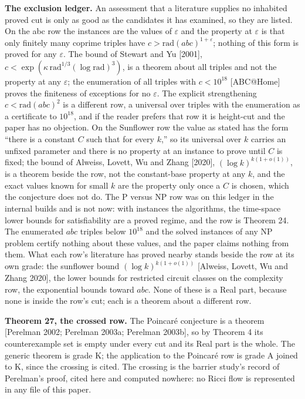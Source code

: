 \documentclass[10pt,twocolumn]{article}
\begin{document}
\textbf{The exclusion ledger.} An assessment that a literature supplies
no inhabited proved cut is only as good as the candidates it has
examined, so they are listed. On the abc row the instances are the
values of \(\varepsilon\) and the property at \(\varepsilon\) is that
only finitely many coprime triples have
\(c > \mathrm{rad}(abc)^{1+\varepsilon}\); nothing of this form is
proved for any \(\varepsilon\). The bound of Stewart and Yu {[}2001{]},
\(c < \exp(\kappa\, \mathrm{rad}^{1/3} (\log \mathrm{rad})^3)\), is a
theorem about all triples and not the property at any \(\varepsilon\);
the enumeration of all triples with \(c < 10^{18}\) {[}ABC@Home{]}
proves the finiteness of exceptions for no \(\varepsilon\). The explicit
strengthening \(c < \mathrm{rad}(abc)^2\) is a different row, a
universal over triples with the enumeration as a certificate to
\(10^{18}\), and if the reader prefers that row it is height-cut and the
paper has no objection. On the Sunflower row the value as stated has the
form ``there is a constant \(C\) such that for every \(k\),'' so its
universal over \(k\) carries an unfixed parameter and there is no
property at an instance to prove until \(C\) is fixed; the bound of
Alweiss, Lovett, Wu and Zhang {[}2020{]}, \((\log k)^{k(1+o(1))}\), is a
theorem beside the row, not the constant-base property at any \(k\), and
the exact values known for small \(k\) are the property only once a
\(C\) is chosen, which the conjecture does not do. The P versus NP row
was on this ledger in the internal builds and is not now: with instances
the algorithms, the time-space lower bounds for satisfiability are a
proved regime, and the row is Theorem 24. The enumerated \(abc\) triples
below \(10^{18}\) and the solved instances of any \(\mathrm{NP}\)
problem certify nothing about these values, and the paper claims nothing
from them. What each row's literature has proved nearby stands beside
the row at its own grade: the sunflower bound \((\log k)^{k(1 + o(1))}\)
{[}Alweiss, Lovett, Wu and Zhang 2020{]}, the lower bounds for
restricted circuit classes on the complexity row, the exponential bounds
toward \(abc\). None of these is a Real part, because none is inside the
row's cut; each is a theorem about a different row.

\textbf{Theorem 27, the crossed row.} The Poincaré conjecture is a
theorem {[}Perelman 2002; Perelman 2003a; Perelman 2003b{]}, so by
Theorem 4 its counterexample set is empty under every cut and its Real
part is the whole. The generic theorem is grade K; the application to
the Poincaré row is grade A joined to K, since the crossing is cited.
The crossing is the barrier study's record of Perelman's proof, cited
here and computed nowhere: no Ricci flow is represented in any file of
this paper.
\end{document}
